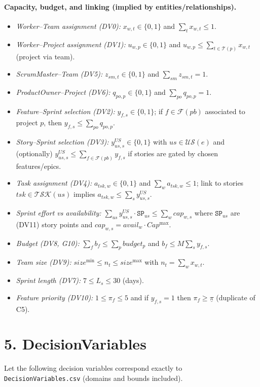 \documentclass[11pt,a4paper]{article}
\begin{document}
\paragraph{Capacity, budget, and linking (implied by entities/relationships).}
\begin{itemize}[leftmargin=2em]
  \item \emph{Worker--Team assignment (DV0):} $x_{w,t}\in\{0,1\}$ and $\sum_{t}x_{w,t}\le 1$.
  \item \emph{Worker--Project assignment (DV1):} $u_{w,p}\in\{0,1\}$ and $u_{w,p}\le \sum_{t\in\mathcal{T}(p)} x_{w,t}$ (project via team).
  \item \emph{ScrumMaster--Team (DV5):} $z_{sm,t}\in\{0,1\}$ and $\sum_{sm} z_{sm,t}=1$.
  \item \emph{ProductOwner--Project (DV6):} $q_{po,p}\in\{0,1\}$ and $\sum_{po} q_{po,p}=1$.
  \item \emph{Feature--Sprint selection (DV2):} $y_{f,s}\in\{0,1\}$; if $f\in\mathcal{F}(pb)$ associated to project $p$, then $y_{f,s}\le \sum_{po} q_{po,p}$.
  \item \emph{Story--Sprint selection (DV3):} $y^{US}_{us,s}\in\{0,1\}$ with $us\in\mathcal{U\!S}(e)$ and (optionally) $y^{US}_{us,s}\le \sum_{f\in\mathcal{F}(pb)} y_{f,s}$ if stories are gated by chosen features/epics.
  \item \emph{Task assignment (DV4):} $a_{tsk,w}\in\{0,1\}$ and $\sum_{w} a_{tsk,w}\le 1$; link to stories $tsk\in\mathcal{T\!S\!K}(us)$ implies $a_{tsk,w}\le \sum_{s} y^{US}_{us,s}$.
  \item \emph{Sprint effort vs availability:} $\sum_{us}y^{US}_{us,s}\cdot \texttt{SP}_{us}\le \sum_{w} cap_{w,s}$ where $\texttt{SP}_{us}$ are (DV11) story points and $cap_{w,s} = avail_w\cdot Cap^{\max}$.
  \item \emph{Budget (DV8, G10):} $\sum_{f} b_f \le \sum_{p} budget_p$ and $b_f \le M\sum_{s} y_{f,s}$.
  \item \emph{Team size (DV9):} $size^{\min}\le n_t \le size^{\max}$ with $n_t=\sum_{w} x_{w,t}$.
  \item \emph{Sprint length (DV7):} $7\le L_s \le 30$ (days).
  \item \emph{Feature priority (DV10):} $1\le \pi_f \le 5$ and if $y_{f,s}=1$ then $\pi_f\ge \underline{\pi}$ (duplicate of C5).
\end{itemize}

\section{5. DecisionVariables}
Let the following decision variables correspond exactly to \texttt{DecisionVariables.csv} (domains and bounds included).
\end{document}
